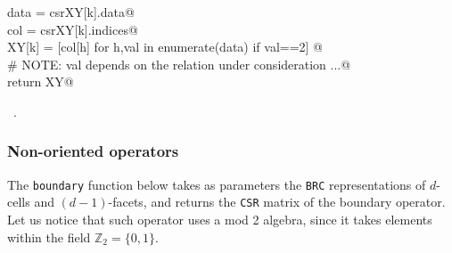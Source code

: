 \documentclass[11pt,oneside]{article}	%
\def\Z{\mathbb{Z}}
\begin{document}
\begin{flushleft}
\begin{list}{}{}
\mbox{}\verb@            data = csrXY[k].data@\\
\mbox{}\verb@            col = csrXY[k].indices@\\
\mbox{}\verb@            XY[k] = [col[h] for h,val in enumerate(data) if val==2] @\\
\mbox{}\verb@            # NOTE: val depends on the relation under consideration ...@\\
\mbox{}\verb@        return XY@\\
\mbox{}\verb@@{\NWsep}
\end{list}
\vspace{-1ex}
\footnotesize\addtolength{\baselineskip}{-1ex}
\begin{list}{}{\setlength{\itemsep}{-\parsep}\setlength{\itemindent}{-\leftmargin}}
\item \NWtxtMacroRefIn\ .
\end{list}
\end{flushleft}


\subsubsection{Non-oriented operators}

The \texttt{boundary} function below takes as parameters the \texttt{BRC} representations of $d$-cells and $(d-1)$-facets, and returns the \texttt{CSR} matrix of the boundary operator. Let us notice that such operator uses a mod 2 algebra, since it takes elements within the field $\Z_2=\{0,1\}$.
\end{document}
